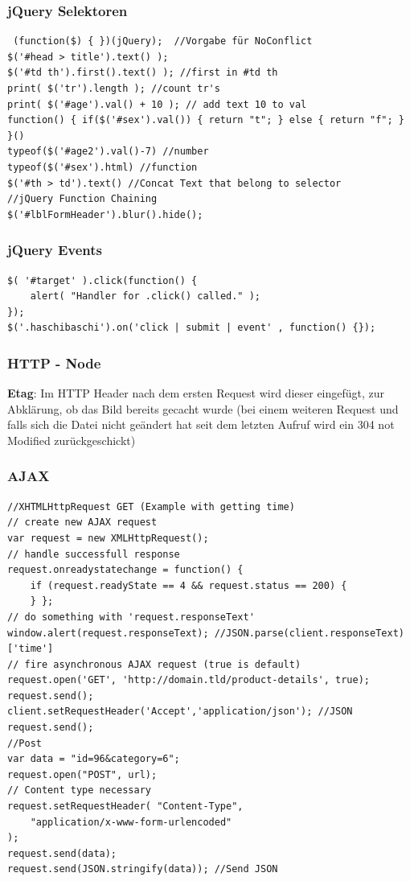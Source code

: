 \begin{multicols*}{4}
\subsubsection{jQuery Selektoren}

 \begin{verbatim}
 (function($) { })(jQuery);  //Vorgabe für NoConflict
$('#head > title').text() );
$('#td th').first().text() ); //first in #td th
print( $('tr').length ); //count tr's
print( $('#age').val() + 10 ); // add text 10 to val
function() { if($('#sex').val()) { return "t"; } else { return "f"; } }()
typeof($('#age2').val()-7) //number
typeof($('#sex').html) //function
$('#th > td').text() //Concat Text that belong to selector
//jQuery Function Chaining
$('#lblFormHeader').blur().hide();
 \end{verbatim}
 
 \subsubsection{jQuery Events}
  \begin{verbatim}
$( '#target' ).click(function() {
    alert( "Handler for .click() called." );
});
$('.haschibaschi').on('click | submit | event' , function() {});
\end{verbatim}

\subsubsection{HTTP - Node}
\textbf{Etag}: Im HTTP Header nach dem ersten Request wird dieser eingefügt, zur 
Abklärung, ob das Bild bereits gecacht wurde 
(bei einem weiteren Request und falls sich die Datei nicht geändert hat seit dem letzten 
Aufruf wird ein 304 not Modified zurückgeschickt)

\subsubsection{AJAX}
\begin{verbatim}
//XHTMLHttpRequest GET (Example with getting time)
// create new AJAX request
var request = new XMLHttpRequest();
// handle successfull response
request.onreadystatechange = function() {
    if (request.readyState == 4 && request.status == 200) {
    } };
// do something with 'request.responseText'
window.alert(request.responseText); //JSON.parse(client.responseText)['time']
// fire asynchronous AJAX request (true is default)
request.open('GET', 'http://domain.tld/product-details', true); 
request.send();
client.setRequestHeader('Accept','application/json'); //JSON
request.send();
//Post
var data = "id=96&category=6";
request.open("POST", url);
// Content type necessary
request.setRequestHeader( "Content-Type",
    "application/x-www-form-urlencoded"
); 
request.send(data);
request.send(JSON.stringify(data)); //Send JSON
 \end{verbatim}
 

\end{multicols*}
